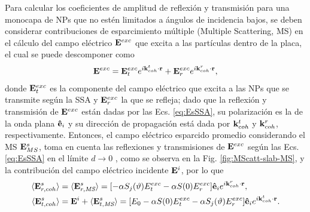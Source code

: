 Para calcular los coeficientes de amplitud de reflexión y transmisión para una monocapa de NPs que no estén limitados a ángulos de incidencia bajos, se deben considerar contribuciones de esparcimiento múltiple (Multiple Scattering, MS) en el cálculo del campo eléctrico $\vb{E}^{exc}$  que excita a las partículas dentro de la placa, el cual se puede descomponer como 
	\begin{align}
	\vb{E}^{exc} = \vb{E}^{exc}_{t} e^{i\vb{k}^t_{coh}\cdot\vb{r}}+
					\vb{E}^{exc}_{r} e^{i\vb{k}^r_{coh}\cdot\vb{r}},
	\end{align}
donde  $\vb{E}^{exc}_t$ es la componente del campo eléctrico que excita a las NPs que se transmite según la SSA y $\vb{E}^{exc}_{r}$ la que se refleja; dado que la reflexión y transmisión de $\vb{E}^{exc}$ están dadas por las Ecs. \eqref{eq:EsSSA}, su polarización es la de la onda plana $\vu{e}_i$ y su dirección de propagación está dada por $\vb{k}^t_{coh}$ y $\vb{k}^r_{coh}$, respectivamente. Entonces, el campo eléctrico esparcido promedio considerando el MS $\vb{E}^s_{MS}$, toma en cuenta  las reflexiones y transmisiones de $\vb{E}^{exc}$ según las Ecs. \eqref{eq:EsSSA} en el límite $d\to 0$ \cite{gutierrez2012overview}, como se observa en la Fig. \ref{fig:MScatt-slab-MS}, y la contribución del campo eléctrico incidente $\vb{E}^i$, por lo que  \cite{reyes2018analytical}
%
	\begin{subequations}\begin{align}
		\langle \vb{E}^s_{r,coh}\rangle & =	\langle \vb{E}^s_{r,\textit{MS}}\rangle
					= \qty[-\alpha S_j(\vartheta)E^{exc}_t -\alpha S(0)E^{exc}_r
					]\vu{e}_i e^{i\vb{k}^r_{coh}\cdot\vb{r}},\\
		\langle \vb{E}^s_{t,coh}\rangle & =\vb{E}^i+\langle\vb{E}^s_{t,\textit{MS}}\rangle
					= \qty[E_0 -\alpha S(0)E^{exc}_t 
					-\alpha	 S_j(\vartheta)E^{exc}_r
					]\vu{e}_i e^{i\vb{k}^t_{coh}\cdot\vb{r}}.
	\end{align} \label{eqs:EsMS}\end{subequations} \vspace*{-2em}

